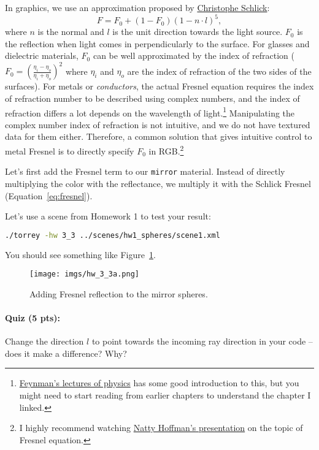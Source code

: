 In graphics, we use an approximation proposed by \href{https://en.wikipedia.org/wiki/Schlick%27s_approximation}{Christophe Schlick}:
\begin{equation}
F = F_0 + (1 - F_0) \left(1 - n \cdot l\right)^5,
\label{eq:fresnel}
\end{equation}
where $n$ is the normal and $l$ is the unit direction towards the light source. $F_0$ is the reflection when light comes in perpendicularly to the surface. For glasses and dielectric materials, $F_0$ can be well approximated by the index of refraction ($F_0 = \left(\frac{\eta_i - \eta_o}{\eta_i + \eta_o}\right)^2$ where $\eta_i$ and $\eta_o$ are the index of refraction of the two sides of the surfaces). For metals or \emph{conductors}, the actual Fresnel equation requires the index of refraction number to be described using complex numbers, and the index of refraction differs a lot depends on the wavelength of light.\footnote{\href{https://www.feynmanlectures.caltech.edu/I_31.html}{Feynman's lectures of physics} has some good introduction to this, but you might need to start reading from earlier chapters to understand the chapter I linked.} Manipulating the complex number index of refraction is not intuitive, and we do not have textured data for them either. Therefore, a common solution that gives intuitive control to metal Fresnel is to directly specify $F_0$ in RGB.\footnote{I highly recommend watching \href{https://www.youtube.com/watch?v=kEcDbl7eS0w}{Natty Hoffman's presentation} on the topic of Fresnel equation.}

Let's first add the Fresnel term to our \lstinline{mirror} material. Instead of directly multiplying the color with the reflectance, we multiply it with the Schlick Fresnel (Equation~\eqref{eq:fresnel}). 

Let's use a scene from Homework 1 to test your result:
\begin{lstlisting}[language=bash]
./torrey -hw 3_3 ../scenes/hw1_spheres/scene1.xml
\end{lstlisting}

You should see something like Figure~\ref{fig:hw_3_3_fresnel}.

\begin{figure}[ht]
    \centering
    \texttt{[image: imgs/hw\_3\_3a.png]}
    \caption{Adding Fresnel reflection to the mirror spheres.}
    \label{fig:hw_3_3_fresnel}
\end{figure}

\paragraph{Quiz (5 pts):} Change the direction $l$ to point towards the incoming ray direction in your code -- does it make a difference? Why?

